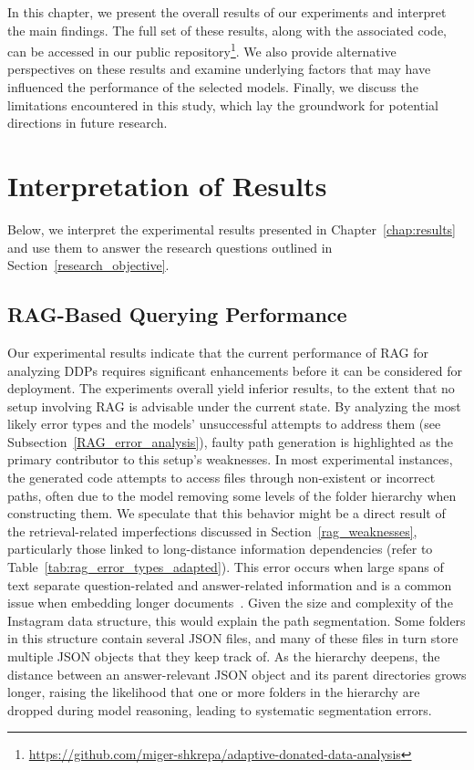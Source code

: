 \documentclass{DESSThesis}
\begin{document}
In this chapter, we present the overall results of our experiments and interpret the main findings. The full set of these results, along with the associated code, can be accessed in our public repository\footnote{\url{https://github.com/miger-shkrepa/adaptive-donated-data-analysis}}. We also provide alternative perspectives on these results and examine underlying factors that may have influenced the performance of the selected models. Finally, we discuss the limitations encountered in this study, which lay the groundwork for potential directions in future research.

\section{Interpretation of Results}

Below, we interpret the experimental results presented in Chapter~\ref{chap:results} and use them to answer the research questions outlined in Section~\ref{research_objective}.

\subsection{RAG-Based Querying Performance}

Our experimental results indicate that the current performance of RAG for analyzing DDPs requires significant enhancements before it can be considered for deployment. The experiments overall yield inferior results, to the extent that no setup involving RAG is advisable under the current state. By analyzing the most likely error types and the models' unsuccessful attempts to address them (see Subsection~\ref{RAG_error_analysis}), faulty path generation is highlighted as the primary contributor to this setup's weaknesses. In most experimental instances, the generated code attempts to access files through non-existent or incorrect paths, often due to the model removing some levels of the folder hierarchy when constructing them. We speculate that this behavior might be a direct result of the retrieval-related imperfections discussed in Section~\ref{rag_weaknesses}, particularly those linked to long-distance information dependencies (refer to Table~\ref{tab:rag_error_types_adapted}). This error occurs when large spans of text separate question-related and answer-related information and is a common issue when embedding longer documents~\cite{Chen_Lin_Han_Sun_2024}. Given the size and complexity of the Instagram data structure, this would explain the path segmentation. Some folders in this structure contain several JSON files, and many of these files in turn store multiple JSON objects that they keep track of. As the hierarchy deepens, the distance between an answer-relevant JSON object and its parent directories grows longer, raising the likelihood that one or more folders in the hierarchy are dropped during model reasoning, leading to systematic segmentation errors.
\end{document}

